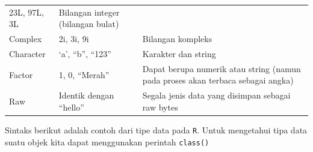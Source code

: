 \documentclass[]{book}
\theoremstyle{definition}
\theoremstyle{definition}
\theoremstyle{definition}
\theoremstyle{remark}
\begin{document}
\begin{longtable}[]{@{}lll@{}}
\begin{minipage}[t]{0.19\columnwidth}
23L, 97L, 3L\strut
\end{minipage} & \begin{minipage}[t]{0.61\columnwidth}\raggedright
Bilangan integer (bilangan bulat)\strut
\end{minipage}\tabularnewline
\begin{minipage}[t]{0.11\columnwidth}\raggedright
Complex\strut
\end{minipage} & \begin{minipage}[t]{0.19\columnwidth}\raggedright
2i, 3i, 9i\strut
\end{minipage} & \begin{minipage}[t]{0.61\columnwidth}\raggedright
Bilangan kompleks\strut
\end{minipage}\tabularnewline
\begin{minipage}[t]{0.11\columnwidth}\raggedright
Character\strut
\end{minipage} & \begin{minipage}[t]{0.19\columnwidth}\raggedright
`a', ``b'', ``123''\strut
\end{minipage} & \begin{minipage}[t]{0.61\columnwidth}\raggedright
Karakter dan string\strut
\end{minipage}\tabularnewline
\begin{minipage}[t]{0.11\columnwidth}\raggedright
Factor\strut
\end{minipage} & \begin{minipage}[t]{0.19\columnwidth}\raggedright
1, 0, ``Merah''\strut
\end{minipage} & \begin{minipage}[t]{0.61\columnwidth}\raggedright
Dapat berupa numerik atau string (namun pada proses akan terbaca sebagai angka)\strut
\end{minipage}\tabularnewline
\begin{minipage}[t]{0.11\columnwidth}\raggedright
Raw\strut
\end{minipage} & \begin{minipage}[t]{0.19\columnwidth}\raggedright
Identik dengan ``hello''\strut
\end{minipage} & \begin{minipage}[t]{0.61\columnwidth}\raggedright
Segala jenis data yang disimpan sebagai raw bytes\strut
\end{minipage}\tabularnewline
\bottomrule
\end{longtable}

Sintaks berikut adalah contoh dari tipe data pada \texttt{R}. Untuk mengetahui tipa data suatu objek kita dapat menggunakan perintah \texttt{class()}
\end{document}
